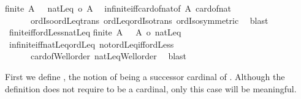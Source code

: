 \begin{isabellebody}
{\isachardoublequoteopen}{\isasymnot}finite\ A\ {\isacharequal}{\kern0pt}\ {\isacharparenleft}{\kern0pt}\ natLeq\ {\isasymle}o\ {\isacharbar}{\kern0pt}A{\isacharbar}{\kern0pt}\ {\isacharparenright}{\kern0pt}{\isachardoublequoteclose}\isanewline
%
\isadelimproof
%
\endisadelimproof
%
\isatagproof
{}\isamarkupfalse%
\ infinite{\isacharunderscore}{\kern0pt}iff{\isacharunderscore}{\kern0pt}card{\isacharunderscore}{\kern0pt}of{\isacharunderscore}{\kern0pt}nat{\isacharbrackleft}{\kern0pt}of\ A{\isacharbrackright}{\kern0pt}\ card{\isacharunderscore}{\kern0pt}of{\isacharunderscore}{\kern0pt}nat\isanewline
\ \ \ \ \ \ ordIso{\isacharunderscore}{\kern0pt}ordLeq{\isacharunderscore}{\kern0pt}trans\ ordLeq{\isacharunderscore}{\kern0pt}ordIso{\isacharunderscore}{\kern0pt}trans\ ordIso{\isacharunderscore}{\kern0pt}symmetric\ \isamarkupfalse%
\ blast%
\endisatagproof
{\isafoldproof}%
%
\isadelimproof
\isanewline
%
\endisadelimproof
\isanewline
{}\isamarkupfalse%
\ finite{\isacharunderscore}{\kern0pt}iff{\isacharunderscore}{\kern0pt}ordLess{\isacharunderscore}{\kern0pt}natLeq{\isacharcolon}{\kern0pt}\isanewline
{\isachardoublequoteopen}finite\ A\ {\isacharequal}{\kern0pt}\ {\isacharparenleft}{\kern0pt}\ {\isacharbar}{\kern0pt}A{\isacharbar}{\kern0pt}\ {\isacharless}{\kern0pt}o\ natLeq{\isacharparenright}{\kern0pt}{\isachardoublequoteclose}\isanewline
%
\isadelimproof
%
\endisadelimproof
%
\isatagproof
{}\isamarkupfalse%
\ infinite{\isacharunderscore}{\kern0pt}iff{\isacharunderscore}{\kern0pt}natLeq{\isacharunderscore}{\kern0pt}ordLeq\ not{\isacharunderscore}{\kern0pt}ordLeq{\isacharunderscore}{\kern0pt}iff{\isacharunderscore}{\kern0pt}ordLess\isanewline
\ \ \ \ \ \ card{\isacharunderscore}{\kern0pt}of{\isacharunderscore}{\kern0pt}Well{\isacharunderscore}{\kern0pt}order\ natLeq{\isacharunderscore}{\kern0pt}Well{\isacharunderscore}{\kern0pt}order\ \isamarkupfalse%
\ blast%
\endisatagproof
{\isafoldproof}%
%
\isadelimproof
%
\endisadelimproof
%
\isadelimdocument
%
\endisadelimdocument
%
\isatagdocument
%
\isamarkuptrue%
%
\endisatagdocument
{\isafolddocument}%
%
\isadelimdocument
%
\endisadelimdocument
%
\begin{isamarkuptext}%
First we define , the notion of 
being a successor cardinal of . Although the definition does
not require  to be a cardinal, only this case will be meaningful.%
\end{isamarkuptext}\isamarkuptrue%

\end{isabellebody}
